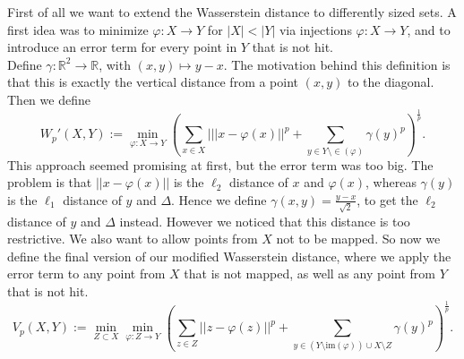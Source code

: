 \documentclass[11pt, a4paper, UKenglish]{article}
\newcommand{\bR}{\mathbb{R}}
\newcommand{\im}{\textrm{im}}
\begin{document}
    First of all we want to extend the Wasserstein distance to differently sized sets.
    A first idea was to minimize $\varphi:X\rightarrow Y$ for $|X|<|Y|$ via injections $\varphi:X\rightarrow Y$, and to introduce an error term for every point in $Y$ that is not hit.\\
    Define $\gamma:\bR^2\rightarrow\bR$, with $(x,y)\mapsto y-x$.
    The motivation behind this definition is that this is exactly the vertical distance from a point $(x,y)$ to the diagonal.
    Then we define \[W_p'(X,Y):=\min_{\varphi:X\rightarrow Y}\left(\sum_{x\in X}|||x-\varphi(x)||^p + \sum_{y\in Y\setminus \in(\varphi)}\gamma(y)^p\right)^\frac{1}{p}.\]
    This approach seemed promising at first, but the error term was too big.
    The problem is that $||x-\varphi(x)||$ is the $\ell_2$ distance of $x$ and $\varphi(x)$, whereas $\gamma(y)$ is the $\ell_1$ distance of $y$ and $\Delta$.
    Hence we define $\gamma(x,y)=\frac{y-x}{\sqrt{2}}$, to get the $\ell_2$ distance of $y$ and $\Delta$ instead.
    However we noticed that this distance is too restrictive.
    We also want to allow points from $X$ not to be mapped.
    So now we define the final version of our modified Wasserstein distance, where we apply the error term to any point from $X$ that is not mapped, as well as any point from $Y$ that is not hit.
    \[V_p(X,Y):=\min_{Z\subset{X}}\min_{\varphi:Z\rightarrow Y}\left(\sum_{z\in Z}||z-\varphi(z)||^p + \sum_{y\in (Y\setminus \im(\varphi))\cup X\setminus Z}\gamma(y)^p\right)^\frac{1}{p}.\]
\end{document}
